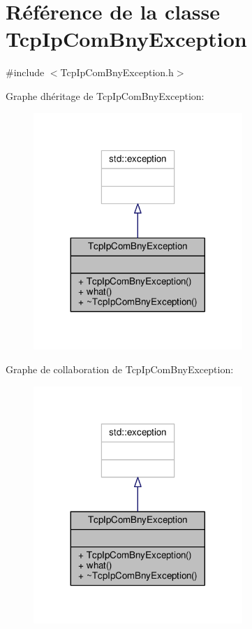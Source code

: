 \hypertarget{classTcpIpComBnyException}{}\section{Référence de la classe Tcp\+Ip\+Com\+Bny\+Exception}
\label{classTcpIpComBnyException}


{\ttfamily \#include $<$Tcp\+Ip\+Com\+Bny\+Exception.\+h$>$}



Graphe d\textquotesingle{}héritage de Tcp\+Ip\+Com\+Bny\+Exception\+:
\nopagebreak
\begin{figure}[H]
\begin{center}
\leavevmode
\includegraphics[width=224pt]{classTcpIpComBnyException__inherit__graph}
\end{center}
\end{figure}


Graphe de collaboration de Tcp\+Ip\+Com\+Bny\+Exception\+:
\nopagebreak
\begin{figure}[H]
\begin{center}
\leavevmode
\includegraphics[width=224pt]{classTcpIpComBnyException__coll__graph}
\end{center}
\end{figure}
